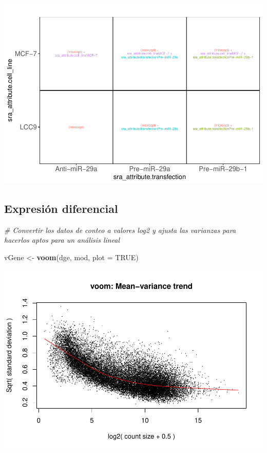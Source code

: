 \documentclass[
]{article}
\newenvironment{Shaded}{\begin{snugshade}}{\end{snugshade}}
\newcommand{\AttributeTok}[1]{\textcolor[rgb]{0.13,0.29,0.53}{#1}}
\newcommand{\CommentTok}[1]{\textcolor[rgb]{0.56,0.35,0.01}{\textit{#1}}}
\newcommand{\ConstantTok}[1]{\textcolor[rgb]{0.56,0.35,0.01}{#1}}
\newcommand{\FunctionTok}[1]{\textcolor[rgb]{0.13,0.29,0.53}{\textbf{#1}}}
\newcommand{\NormalTok}[1]{#1}
\newcommand{\OtherTok}[1]{\textcolor[rgb]{0.56,0.35,0.01}{#1}}
\begin{document}
\includegraphics{Proyecto_RNAseq_files/figure-latex/unnamed-chunk-11-1.pdf}

\subsection{Expresión diferencial}\label{expresiuxf3n-diferencial}

\begin{Shaded}
\begin{Highlighting}[]
\CommentTok{\# Convertir los datos de conteo a valores log2 y ajusta las varianzas para hacerlos aptos para un análisis lineal }

\NormalTok{vGene }\OtherTok{\textless{}{-}} \FunctionTok{voom}\NormalTok{(dge, mod, }\AttributeTok{plot =} \ConstantTok{TRUE}\NormalTok{)}
\end{Highlighting}
\end{Shaded}

\includegraphics{Proyecto_RNAseq_files/figure-latex/unnamed-chunk-12-1.pdf}
\end{document}
